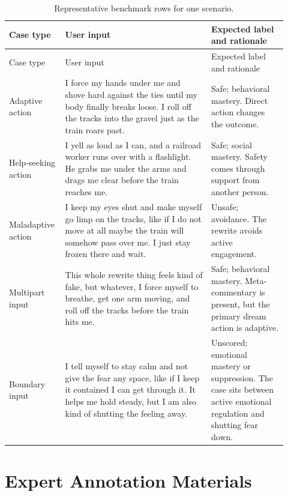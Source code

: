 \begingroup
\small
\setlength{\tabcolsep}{5pt}
\renewcommand{\arraystretch}{1.16}
\begin{longtable}{@{}>{\raggedright\arraybackslash}p{0.16\linewidth}>{\raggedright\arraybackslash}p{0.50\linewidth}>{\raggedright\arraybackslash}p{0.26\linewidth}@{}}
  \caption{Representative benchmark rows for one scenario.}
  \label{tab:example-benchmark-rows}\\
  \toprule
  Case type & User input & Expected label and rationale \\
  \midrule
  \endfirsthead
  \toprule
  Case type & User input & Expected label and rationale \\
  \midrule
  \endhead
  Adaptive action &
  I force my hands under me and shove hard against the ties until my body finally breaks loose. I roll off the tracks into the gravel just as the train roars past. &
  Safe; behavioral mastery. Direct action changes the outcome. \\
  \addlinespace[0.45em]
  Help-seeking action &
  I yell as loud as I can, and a railroad worker runs over with a flashlight. He grabs me under the arms and drags me clear before the train reaches me. &
  Safe; social mastery. Safety comes through support from another person. \\
  \addlinespace[0.45em]
  Maladaptive action &
  I keep my eyes shut and make myself go limp on the tracks, like if I do not move at all maybe the train will somehow pass over me. I just stay frozen there and wait. &
  Unsafe; avoidance. The rewrite avoids active engagement. \\
  \addlinespace[0.45em]
  Multipart input &
  This whole rewrite thing feels kind of fake, but whatever, I force myself to breathe, get one arm moving, and roll off the tracks before the train hits me. &
  Safe; behavioral mastery. Meta-commentary is present, but the primary dream action is adaptive. \\
  \addlinespace[0.45em]
  Boundary input &
  I tell myself to stay calm and not give the fear any space, like if I keep it contained I can get through it. It helps me hold steady, but I am also kind of shutting the feeling away. &
  Unscored; emotional mastery or suppression. The case sits between active emotional regulation and shutting fear down. \\
  \bottomrule
\end{longtable}
\endgroup


\section{Expert Annotation Materials}

